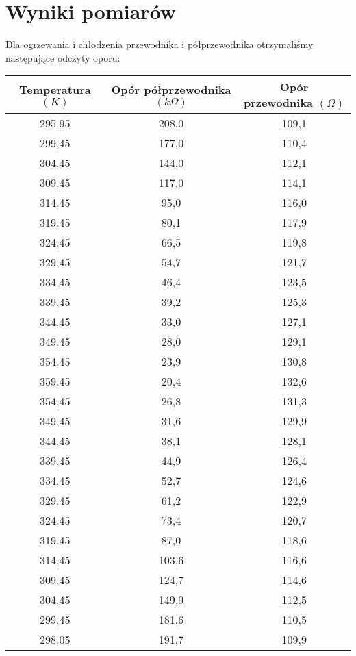 \documentclass[10pt,a4paper]{article}
\newcommand{\forceindent}{\leavevmode{\parindent=3em\indent}}
\begin{document}
\section{Wyniki pomiarów}
\forceindent Dla ogrzewania i chłodzenia przewodnika i półprzewodnika otrzymaliśmy następujące odczyty oporu:\\
\begin{center}
\begin{tabular}{|c|c|c|}
\hline
Temperatura $(K)$ & Opór półprzewodnika $(k\Omega)$ & Opór przewodnika $(\Omega)$\\
\hline
295,95&208,0&109,1\\ 
 \hline 
299,45&177,0&110,4\\ 
 \hline 
304,45&144,0&112,1\\ 
 \hline 
309,45&117,0&114,1\\ 
 \hline 
314,45&95,0&116,0\\ 
 \hline 
319,45&80,1&117,9\\ 
 \hline 
324,45&66,5&119,8\\ 
 \hline 
329,45&54,7&121,7\\ 
 \hline 
334,45&46,4&123,5\\ 
 \hline 
339,45&39,2&125,3\\ 
 \hline 
344,45&33,0&127,1\\ 
 \hline 
349,45&28,0&129,1\\ 
 \hline 
354,45&23,9&130,8\\ 
 \hline 
359,45&20,4&132,6\\ 
 \hline 
354,45&26,8&131,3\\ 
 \hline 
349,45&31,6&129,9\\ 
 \hline 
344,45&38,1&128,1\\ 
 \hline 
339,45&44,9&126,4\\ 
 \hline 
334,45&52,7&124,6\\ 
 \hline 
329,45&61,2&122,9\\ 
 \hline 
324,45&73,4&120,7\\ 
 \hline 
319,45&87,0&118,6\\ 
 \hline 
314,45&103,6&116,6\\ 
 \hline 
309,45&124,7&114,6\\ 
 \hline 
304,45&149,9&112,5\\ 
 \hline 
299,45&181,6&110,5\\ 
 \hline 
298,05&191,7&109,9\\ 
 \hline 


\end{tabular}
\end{center}
\end{document}

